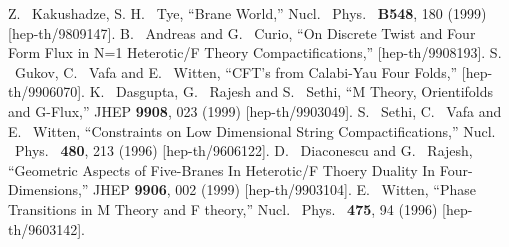 \documentclass[a4paper,12pt]{article}
\numberwithin{equation}{section}
\theoremstyle{plain}
\begin{document}
\begin{thebibliography}{99}
   Z. ~Kakushadze, S. H. ~Tye, ``Brane World,'' 
   Nucl. \ Phys. \ {\bf B548}, 180  (1999)
   [hep-th/9809147]. 
   B. ~Andreas and G. ~Curio, ``On Discrete Twist and Four Form 
   Flux in N=1 Heterotic/F Theory Compactifications,''
   [hep-th/9908193].
   S. ~Gukov, C. ~Vafa and E. ~Witten, ``CFT's from Calabi-Yau 
   Four Folds,''
   [hep-th/9906070].
   K. ~Dasgupta, G. ~Rajesh and S. ~Sethi, ``M Theory, Orientifolds
   and G-Flux,''
   JHEP {\bf 9908}, 023 (1999)
   [hep-th/9903049]. 
   S. ~Sethi, C. ~Vafa and E. ~Witten, ``Constraints on Low Dimensional 
   String Compactifications,'' 
   Nucl. \ Phys. \ {\bf 480}, 213 (1996)
   [hep-th/9606122]. 
   D. ~Diaconescu and G. ~Rajesh, ``Geometric Aspects 
   of Five-Branes 
   In Heterotic/F Thoery Duality In Four-Dimensions,'' 
   JHEP {\bf 9906}, 002 (1999)
   [hep-th/9903104].
   E. ~Witten, ``Phase Transitions in M Theory and F theory,''
   Nucl. \ Phys. \ {\bf 475}, 94 (1996)
   [hep-th/9603142].
\end{thebibliography}
\end{document}
